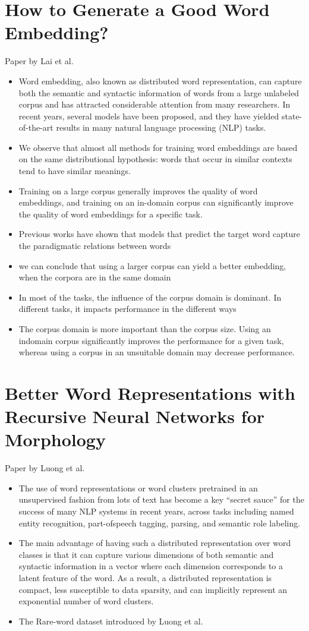 \documentclass[10pt,a4paper]{article}
\begin{document}
\section{How to Generate a Good Word Embedding?}
Paper by Lai et al.\cite{lai2016generate}
\begin{itemize}
\item{Word embedding, also known as distributed word
representation, can capture both the semantic and syntactic
information of words from a large unlabeled corpus
and has attracted considerable attention from many researchers.
In recent years, several models have been proposed,
and they have yielded state-of-the-art results in many
natural language processing (NLP) tasks.}
\item{We observe that almost
all methods for training word embeddings are based on the
same distributional hypothesis: words that occur in similar
contexts tend to have similar meanings.}
\item{Training on a large corpus
generally improves the quality of word embeddings,
and training on an in-domain corpus can significantly
improve the quality of word embeddings for a specific
task.}
\item{Previous works have shown that models that predict the target word capture the paradigmatic relations between words}
\item{we can conclude that using a larger corpus can yield a better embedding, when the corpora are in the same domain}
\item{In most of the tasks, the influence of the corpus domain is
dominant. In different tasks, it impacts performance in the
different ways}
\item{The corpus
domain is more important than the corpus size. Using an indomain
corpus significantly improves the performance for a
given task, whereas using a corpus in an unsuitable domain
may decrease performance. }
\end{itemize}
\section{Better Word Representations with Recursive Neural Networks for Morphology}
Paper by Luong et al.\cite{luong2013better}
\begin{itemize}
\item{The use of word representations or word clusters
pretrained in an unsupervised fashion from lots of
text has become a key “secret sauce” for the success
of many NLP systems in recent years, across
tasks including named entity recognition, part-ofspeech
tagging, parsing, and semantic role labeling.}
\item{The main advantage of having such a distributed
representation over word classes is that it can capture
various dimensions of both semantic and syntactic
information in a vector where each dimension
corresponds to a latent feature of the word. As
a result, a distributed representation is compact,
less susceptible to data sparsity, and can implicitly
represent an exponential number of word clusters.}
\item{The Rare-word dataset introduced by Luong et al.}
\end{itemize}
\end{document}
